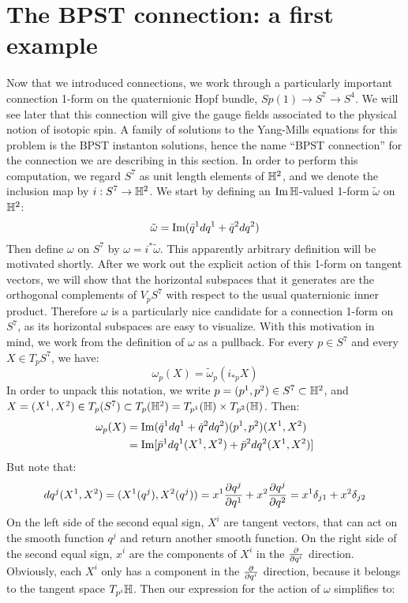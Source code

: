 \section{The BPST connection: a first example}
Now that we introduced connections, we work through a particularly important connection 1-form on the quaternionic Hopf bundle, $Sp(1) \to S^7 \to S^4$. We will see later that this connection will give the gauge fields associated to the physical notion of isotopic spin. A family of solutions to the Yang-Mills equations for this problem is the BPST instanton solutions, hence the name ``BPST connection'' for the connection we are describing in this section. In order to perform this computation, we regard $S^7$ as unit length elements of $\mathbb{H}^2$, and we denote the inclusion map by $i : S^7 \to \mathbb{H}^2$. We start by defining an $\operatorname{Im} \mathbb{H}$-valued 1-form $\tilde \omega$ on $\mathbb{H}^2$:
\[      \tilde \omega = \operatorname{Im}(\bar q^1 dq^1 + \bar q^2 dq^2)     \]
Then define $\omega$ on $S^7$ by $\omega = i^* \tilde \omega$. This apparently arbitrary definition will be motivated shortly. After we work out the explicit action of this 1-form on tangent vectors, we will show that the horizontal subspaces that it generates are the orthogonal complements of $V_p S^7$ with respect to the usual quaternionic inner product. Therefore $\omega$ is a particularly nice candidate for a connection 1-form on $S^7$, as its horizontal subspaces are easy to visualize. With this motivation in mind, we work from the definition of $\omega$ as a pullback. For every $p \in S^7$ and every $X \in T_p S^7$, we have:
\[     \omega_p (X) = \tilde \omega_p (i_{*p} X)    \]
In order to unpack this notation, we write $p = (p^1, p^2) \in S^7 \subset \mathbb{H}^2$, and $X = (X^1, X^2) \in T_p(S^7) \subset T_p(\mathbb{H}^2) = T_{p^1} (\mathbb{H}) \times T_{p^2} (\mathbb{H})$. Then:
\begin{align*}
\omega_p(X) &= \operatorname{Im}(\bar q^1 dq^1 + \bar q^2 dq^2)(p^1, p^2)(X^1, X^2)  \\
&= \operatorname{Im}[\bar p^1 dq^1(X^1, X^2) + \bar p^2 dq^2(X^1, X^2)] 
\end{align*}
But note that:
\[   dq^j(X^1, X^2) = (X^1(q^j), X^2(q^j)) = x^1 \frac{\partial q^j}{\partial q^1} + x^2 \frac{\partial q^j}{\partial q^2} = x^1 \delta_{j1} + x^2 \delta_{j2} \]
On the left side of the second equal sign, $X^i$ are tangent vectors, that can act on the smooth function $q^j$ and return another smooth function. On the right side of the second equal sign, $x^i$ are the components of $X^i$ in the $\frac{\partial}{\partial q^i}$ direction. Obviously, each $X^i$ only has a component in the $\frac{\partial}{\partial q^i}$ direction, because it belongs to the tangent space $T_{p^i}\mathbb{H}$. Then our expression for the action of $\omega$ simplifies to:
